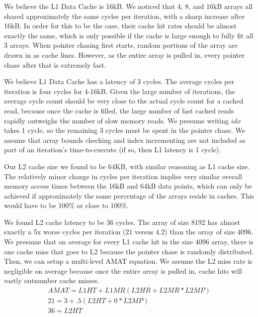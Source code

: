 \documentclass[11pt]{article}
\begin{document}



We believe the L1 Data Cache is 16kB. We noticed that 4, 8, and 16kB arrays all shared approximately the same cycles per iteration, with a sharp increase after 16kB. In order for this to be the case, their cache hit rates should be almost exactly the same, which is only possible if the cache is large enough to fully fit all 3 arrays. When pointer chasing first starts, random portions of the array are drawn in as cache lines. However, as the entire array is pulled in, every pointer chase after that is extremely fast. \bigbreak

We believe L1 Data Cache has a latency of 3 cycles. The average cycles per iteration is four cycles for 4-16kB. Given the large number of iterations, the average cycle count should be very close to the actual cycle count for a cached read, because once the cache is filled, the large number of fast cached reads rapidly outweighs the number of slow memory reads. We presume writing $idx$ takes 1 cycle,  so the remaining 3 cycles must be spent in the pointer chase. We assume that array bounds checking and index incrementing are not included as part of an iteration's time-to-execute (if so, then L1 latency is 1 cycle). \bigbreak


Our L2 cache size we found to be 64KB, with similar reasoning as L1 cache size. The relatively minor change in cycles per iteration implies very similar overall memory access times between the 16kB and 64kB data points, which can only be achieved if approximately the same percentage of the arrays reside in caches. This would have to be 100\% or close to 100\%. \bigbreak

We found L2 cache latency to be 36 cycles. The array of size 8192 has almost exactly a 5x worse cycles per iteration ($21$ versus $4.2$) than the array of size 4096. We presume that on average for every L1 cache hit in the size 4096 array, there is one cache miss that goes to L2 because the pointer chase is randomly distributed. Then, we can setup a multi-level AMAT equation. We assume the L2 miss rate is negligible on average because once the entire array is pulled in, cache hits will vastly outnumber cache misses.
\begin{gather*}
	AMAT = L1HT+L1MR(L2HR +L2MR*L2MP) \\
	21 = 3 + .5(L2HT + 0*L2MP) \\
	36 = L2HT
\end{gather*}
\end{document}
